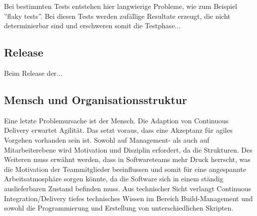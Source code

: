 Bei bestimmten Tests entstehen hier langwierige Probleme, wie zum Beispiel ''flaky tests''. Bei diesen Tests werden zufällige Resultate erzeugt, die nicht determinierbar sind und erschweren somit die Testphase...


\subsection{Release}

Beim Release der... 


\subsection{Mensch und Organisationsstruktur}
Eine letzte Problemursache ist der Mensch. Die Adaption von Continuous Delivery erwartet Agilität. Das setzt voraus, dass eine Akzeptanz für agiles Vorgehen vorhanden sein ist. Sowohl auf Management- als auch auf Mitarbeiterebene wird Motivation und Disziplin erfordert, da die Strukturen. Des Weiteren muss erwähnt werden, dass in Softwareteams mehr Druck herrscht, was die Motivation der Teammitglieder beeinflussen und somit für eine angespannte Arbeitsatmosphäre sorgen könnte, da die Software sich in einem ständig auslieferbaren Zustand befinden muss. Aus technischer Sicht verlangt Continuous Integration/Delivery tiefes technisches Wissen im Bereich Build-Management und sowohl die Programmierung und Erstellung von unterschiedlichen Skripten. 